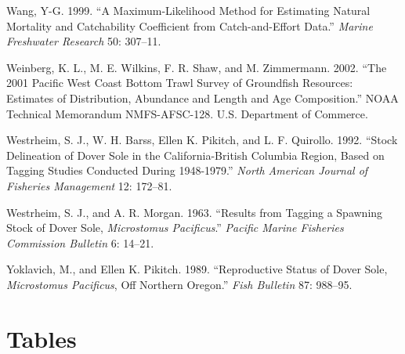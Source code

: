\documentclass[11pt,
  english,
  a4paper,
]{article}
\begin{document}
\begin{cslreferences}
\leavevmode\hypertarget{ref-Wang1999}{}%
Wang, Y-G. 1999. ``A Maximum-Likelihood Method for Estimating Natural Mortality and Catchability Coefficient from Catch-and-Effort Data.'' \emph{Marine Freshwater Research} 50: 307--11.

\leavevmode\hypertarget{ref-weinberg_2001_2002}{}%
Weinberg, K. L., M. E. Wilkins, F. R. Shaw, and M. Zimmermann. 2002. ``The 2001 Pacific West Coast Bottom Trawl Survey of Groundfish Resources: Estimates of Distribution, Abundance and Length and Age Composition.'' NOAA Technical Memorandum NMFS-AFSC-128. U.S. Department of Commerce.

\leavevmode\hypertarget{ref-westrheim_stock_1992}{}%
Westrheim, S. J., W. H. Barss, Ellen K. Pikitch, and L. F. Quirollo. 1992. ``Stock Delineation of Dover Sole in the California-British Columbia Region, Based on Tagging Studies Conducted During 1948-1979.'' \emph{North American Journal of Fisheries Management} 12: 172--81.

\leavevmode\hypertarget{ref-westrheim_results_1963}{}%
Westrheim, S. J., and A. R. Morgan. 1963. ``Results from Tagging a Spawning Stock of Dover Sole, \emph{Microstomus Pacificus}.'' \emph{Pacific Marine Fisheries Commission Bulletin} 6: 14--21.

\leavevmode\hypertarget{ref-yoklavich_reproductive_1989}{}%
Yoklavich, M., and Ellen K. Pikitch. 1989. ``Reproductive Status of Dover Sole, \emph{Microstomus Pacificus}, Off Northern Oregon.'' \emph{Fish Bulletin} 87: 988--95.
\end{cslreferences}

\leavevmode\tagmcend\tagstructend

\clearpage


\hypertarget{tables}{%
\section{Tables}\label{tables}}

\leavevmode\tagmcend\tagstructend



\newpage

\begingroup\fontsize{10}{12}\selectfont
\begingroup\fontsize{10}{12}\selectfont
\end{document}
